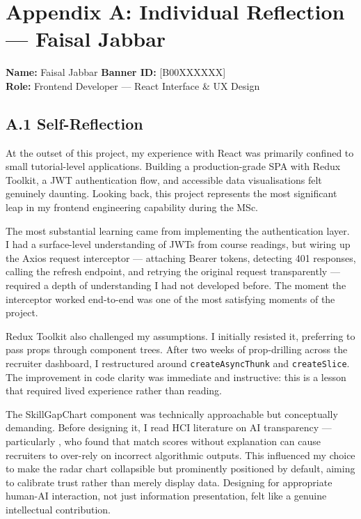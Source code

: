\chapter*{Appendix A: Individual Reflection --- Faisal Jabbar}
\textbf{Name:} Faisal Jabbar \hfill \textbf{Banner ID:} [B00XXXXXX] \\[4pt]
\textbf{Role:} Frontend Developer --- React Interface \& UX Design
\vspace{1em}

\section*{A.1 Self-Reflection}

At the outset of this project, my experience with React was primarily confined to small tutorial-level applications. Building a production-grade SPA with Redux Toolkit, a JWT authentication flow, and accessible data visualisations felt genuinely daunting. Looking back, this project represents the most significant leap in my frontend engineering capability during the MSc.

The most substantial learning came from implementing the authentication layer. I had a surface-level understanding of JWTs from course readings, but wiring up the Axios request interceptor --- attaching Bearer tokens, detecting 401 responses, calling the refresh endpoint, and retrying the original request transparently --- required a depth of understanding I had not developed before. The moment the interceptor worked end-to-end was one of the most satisfying moments of the project.

Redux Toolkit also challenged my assumptions. I initially resisted it, preferring to pass props through component trees. After two weeks of prop-drilling across the recruiter dashboard, I restructured around \texttt{createAsyncThunk} and \texttt{createSlice}. The improvement in code clarity was immediate and instructive: this is a lesson that required lived experience rather than reading.

The SkillGapChart component was technically approachable but conceptually demanding. Before designing it, I read HCI literature on AI transparency --- particularly \citet{Raghavan2020}, who found that match scores without explanation can cause recruiters to over-rely on incorrect algorithmic outputs. This influenced my choice to make the radar chart collapsible but prominently positioned by default, aiming to calibrate trust rather than merely display data. Designing for appropriate human-AI interaction, not just information presentation, felt like a genuine intellectual contribution.

